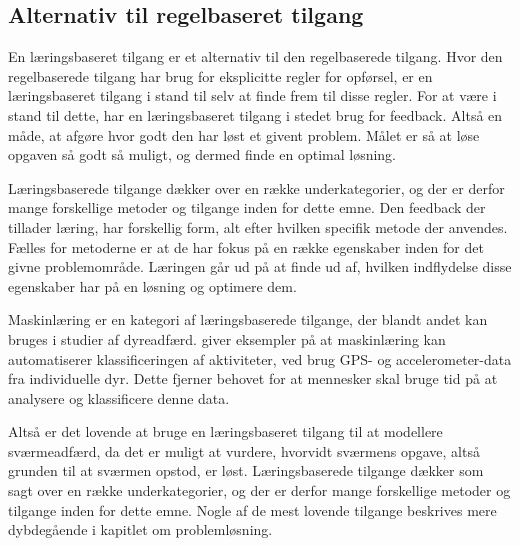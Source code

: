 \subsection{Alternativ til regelbaseret tilgang}
En læringsbaseret tilgang er et alternativ til den regelbaserede tilgang. Hvor den regelbaserede tilgang har brug for eksplicitte regler for opførsel, er en læringsbaseret tilgang i stand til selv at finde frem til disse regler. For at være i stand til dette, har en læringsbaseret tilgang i stedet brug for feedback. Altså en måde, at afgøre hvor godt den har løst et givent problem. Målet er så at løse opgaven så godt så muligt, og dermed finde en optimal løsning. 
\par
Læringsbaserede tilgange dækker over en række underkategorier, og der er derfor mange forskellige metoder og tilgange inden for dette emne. Den feedback der tillader læring, har forskellig form, alt efter hvilken specifik metode der anvendes. Fælles for metoderne er at de har fokus på en række egenskaber inden for det givne problemområde. Læringen går ud på at finde ud af, hvilken indflydelse disse egenskaber har på en løsning og optimere dem.
\par
Maskinlæring er en kategori af læringsbaserede tilgange, der blandt andet kan bruges i studier af dyreadfærd. \cite{VALLETTA2017} giver eksempler på at maskinlæring kan automatiserer klassificeringen af aktiviteter, ved brug GPS- og accelerometer-data fra individuelle dyr. Dette fjerner behovet for at mennesker skal bruge tid på at analysere og klassificere denne data. 
\par
Altså er det lovende at bruge en læringsbaseret tilgang til at modellere sværmeadfærd, da det er muligt at vurdere, hvorvidt sværmens opgave, altså grunden til at sværmen opstod, er løst. Læringsbaserede tilgange dækker som sagt over en række underkategorier, og der er derfor mange forskellige metoder og tilgange inden for dette emne. Nogle af de mest lovende tilgange beskrives mere dybdegående i kapitlet om problemløsning. 








